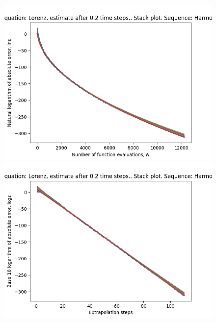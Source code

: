 \begin{figure}[H]
\centering
\begin{minipage}{0.45\textwidth}
\centering
\includegraphics[scale=0.45]{emr_plots/lorenz_02_hp_harmonic_stack.png}
\end{minipage}
\begin{minipage}{0.45\textwidth}
\centering
\includegraphics[scale=0.45]{emr_plots/lorenz_02_hp_harmonic_steps_stack.png}
\end{minipage}
\end{figure}

